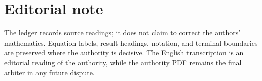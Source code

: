 \documentclass[10pt,a4paper]{article}
\begin{document}
\section*{Editorial note}
The ledger records source readings; it does not claim to correct the authors'
mathematics. Equation labels, result headings, notation, and terminal boundaries
are preserved where the authority is decisive. The English transcription is an
editorial reading of the authority, while the authority PDF remains the final
arbiter in any future dispute.
\end{document}
